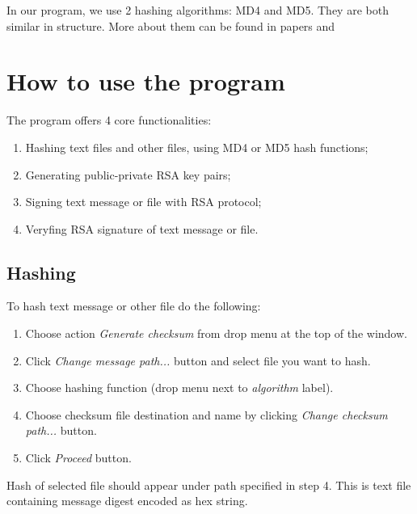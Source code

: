 \documentclass[letterpaper,10pt,english]{sphinxmanual}
\begin{document}
In our program, we use 2 hashing algorithms: MD4 and MD5. They are both
similar in structure. More about them can be found in papers \cite{md4}
and \cite{md5}

\printbibliography


\chapter{How to use the program}
The program offers 4 core functionalities:
\begin{enumerate}
    \item Hashing text files and other files, using MD4 or MD5 hash functions;
    \item Generating public-private RSA key pairs;
    \item Signing text message or file with RSA protocol;
    \item Veryfing RSA signature of text message or file.
\end{enumerate}
\section{Hashing}
To hash text message or other file do the following:
\begin{enumerate}
    \item Choose action {\em Generate checksum} from drop menu at the top of the window.
    \item Click {\em Change message path...} button and select file you want to hash.
    \item Choose hashing function (drop menu next to {\em algorithm} label).
    \item Choose checksum file destination and name by clicking {\em Change checksum path...} button.
    \item Click {\em Proceed} button.
\end{enumerate}
Hash of selected file should appear under path specified in step 4. This is text file containing
message digest encoded as hex string.
\end{document}
